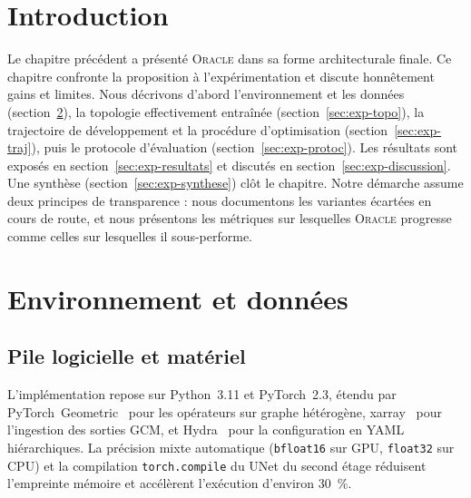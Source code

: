 \documentclass[14pt,a4paper,openany]{extreport}
\theoremstyle{definition}
\newcommand{\Oracle}{\textsc{Oracle}}
\begin{document}
\vspace{1em}

\section{Introduction}
\label{sec:exp-intro}

Le chapitre précédent a présenté \Oracle{} dans sa forme architecturale finale. Ce chapitre confronte la proposition à l'expérimentation et discute honnêtement gains et limites. Nous décrivons d'abord l'environnement et les données (section~\ref{sec:exp-env}), la topologie effectivement entraînée (section~\ref{sec:exp-topo}), la trajectoire de développement et la procédure d'optimisation (section~\ref{sec:exp-traj}), puis le protocole d'évaluation (section~\ref{sec:exp-protoc}). Les résultats sont exposés en section~\ref{sec:exp-resultats} et discutés en section~\ref{sec:exp-discussion}. Une synthèse (section~\ref{sec:exp-synthese}) clôt le chapitre. Notre démarche assume deux principes de transparence : nous documentons les variantes écartées en cours de route, et nous présentons les métriques sur lesquelles \Oracle{} progresse comme celles sur lesquelles il sous-performe.

\section{Environnement et données}
\label{sec:exp-env}

\subsection{Pile logicielle et matériel}
\label{ssec:exp-env-soft}

L'implémentation repose sur Python~3.11 et PyTorch~2.3, étendu par PyTorch~Geometric~\cite{fey_pyg_2019} pour les opérateurs sur graphe hétérogène, xarray~\cite{hoyer_xarray_2017} pour l'ingestion des sorties GCM, et Hydra~\cite{yadan_hydra_2019} pour la configuration en YAML hiérarchiques. La précision mixte automatique (\texttt{bfloat16} sur GPU, \texttt{float32} sur CPU) et la compilation \texttt{torch.compile} du UNet du second étage réduisent l'empreinte mémoire et accélèrent l'exécution d'environ 30~\%.
\end{document}
